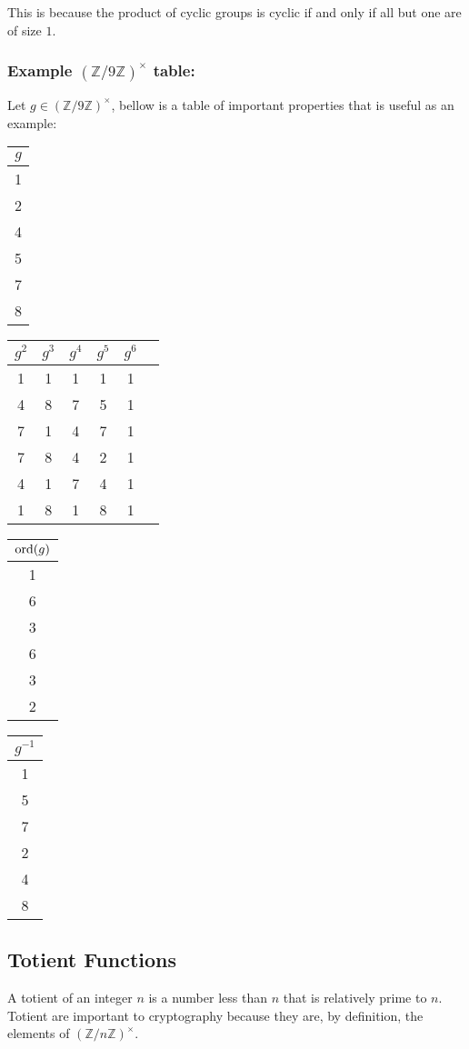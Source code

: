 This is because the product of cyclic groups is cyclic if and only if all but one are of size $1$.

\subsubsection{Example $(\mathbb{Z}/9\mathbb{Z})^\times$ table:}
Let $g\in(\mathbb{Z}/9\mathbb{Z})^\times$,
bellow is a table of important properties that is useful as an example:

\begin{center}
\begin{tabular}{|c|}
	\hline
	$g$\\
	\hline
	1\\2\\4\\5\\7\\8\\
	\hline
\end{tabular}
\begin{tabular}{|c|c|c|c|c|c|}
	\hline
	$g^2$&$g^3$&$g^4$&$g^5$&$g^6$\\
	\hline
	1&1&1&1&1\\
	4&8&7&5&1\\
	7&1&4&7&1\\
	7&8&4&2&1\\
	4&1&7&4&1\\
	1&8&1&8&1\\
	\hline
\end{tabular}
\begin{tabular}{|c|}
	\hline
	$\operatorname{ord}(g)$\\
	\hline
	1\\6\\3\\6\\3\\2\\
	\hline
\end{tabular}
\begin{tabular}{|c|}
	\hline
	$g^{-1}$\\
	\hline
	1\\5\\7\\2\\4\\8\\
	\hline
\end{tabular}
\end{center}


\subsection{Totient Functions}
\label{appx:torient}
A totient of an integer $n$ is a number less than $n$ that is relatively prime to $n$.
Totient are important to cryptography because they are, by definition, the elements of $(\mathbb{Z}/n\mathbb{Z})^\times$.
\\

